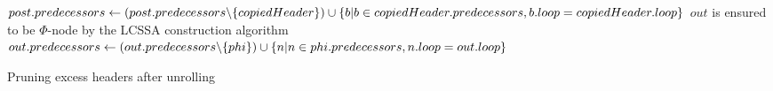 \begin{algorithm}
    \begin{algorithmic}
                \State {}
            \EndFor
                \State $post.predecessors \gets (post.predecessors \backslash \{copiedHeader\}) \cup \newline \{b \vert  b \in copiedHeader.predecessors, b.loop = copiedHeader.loop\}$
            \EndFor
        \EndFunction
        \State{}
                \State \Comment $out$ is ensured to be $\Phi$-node by the LCSSA construction algorithm~\cite{aebi18bachelorarbeit}
                    \State $out.predecessors \gets (out.predecessors \backslash \{phi\}) \cup \newline \{n \vert  n \in phi.predecessors, n.loop = out.loop\}$
                \EndIf
            \EndFor
        \EndFunction
    \end{algorithmic}
    \caption{Pruning excess headers after unrolling}
    \label{alg:impl:unroll:prune-headers}
\end{algorithm}